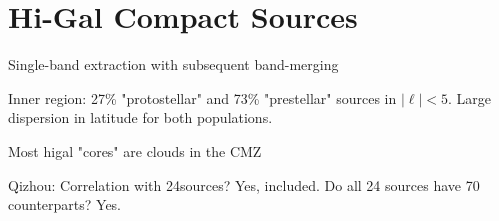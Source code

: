 \section{Hi-Gal Compact Sources}

Single-band extraction with subsequent band-merging

Inner region: 27\% "protostellar" and 73\% "prestellar" sources in $|\ell|<5$.
Large dispersion in latitude for both populations.

Most higal "cores" are clouds in the CMZ

Qizhou: Correlation with 24\um sources?  Yes, included.  Do all 24 \um sources have 70 \um counterparts?  Yes.
